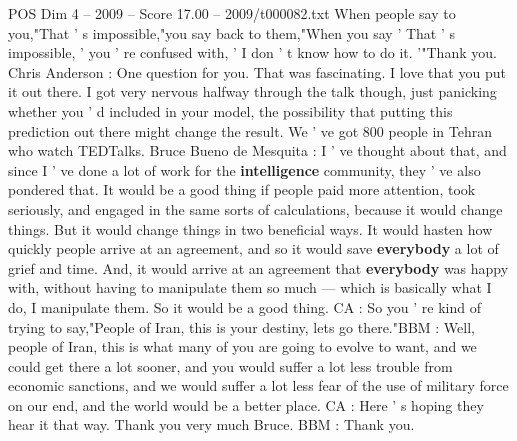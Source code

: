 \begin{textsample}{POS Dim 4 – 2009 – Score 17.00 – 2009/t000082.txt}
When people say to you,"That ' s impossible,"you say back to them,"When you say ' That ' s impossible, ' you ' re confused with, ' I don ' t know how to do it. '"Thank you.
Chris Anderson : One question for you.
That was fascinating.
I love that you put it out there.
I got very nervous halfway through the talk though, just panicking whether you ' d included in your model, the possibility that putting this prediction out there might change the result.
We ' ve got 800 people in Tehran who watch TEDTalks.
Bruce Bueno de Mesquita : I ' ve thought about that, and since I ' ve done a lot of work for the \textbf{intelligence} community, they ' ve also pondered that.
It would be a good thing if people paid more attention, took seriously, and engaged in the same sorts of calculations, because it would change things.
But it would change things in two beneficial ways.
It would hasten how quickly people arrive at an agreement, and so it would save \textbf{everybody} a lot of grief and time.
And, it would arrive at an agreement that \textbf{everybody} was happy with, without having to manipulate them so much — which is basically what I do, I manipulate them.
So it would be a good thing.
CA : So you ' re kind of trying to say,"People of Iran, this is your destiny, lets go there."BBM : Well, people of Iran, this is what many of you are going to evolve to want, and we could get there a lot sooner, and you would suffer a lot less trouble from economic sanctions, and we would suffer a lot less fear of the use of military force on our end, and the world would be a better place.
CA : Here ' s hoping they hear it that way.
Thank you very much Bruce.
BBM : Thank you.

\end{textsample}
